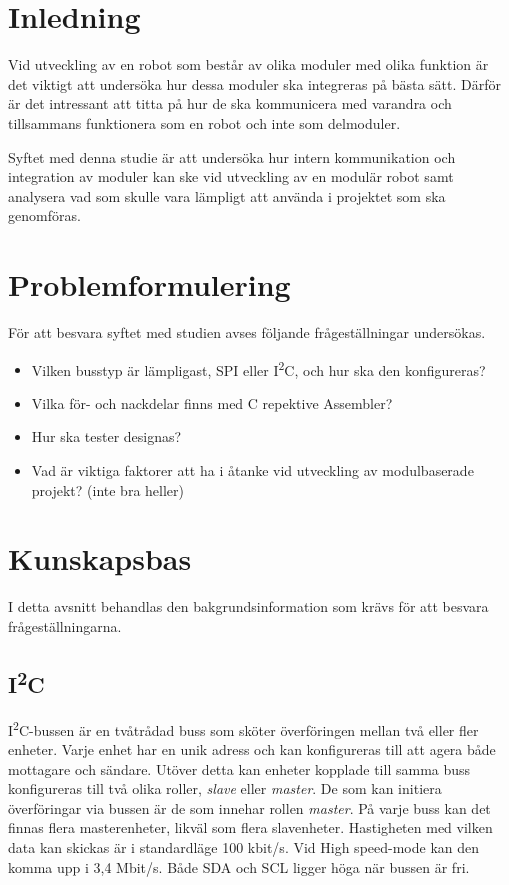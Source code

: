 \documentclass[11pt]{article}
\begin{document}
\begin{flushleft}

\section{Inledning}
Vid utveckling av en robot som består av olika moduler med olika funktion är det viktigt att undersöka hur dessa moduler ska integreras på bästa sätt. Därför är det intressant att titta på hur de ska kommunicera med varandra och tillsammans funktionera som en robot och inte som delmoduler. 

Syftet med denna studie är att undersöka hur intern kommunikation och integration av moduler kan ske vid utveckling av en modulär robot samt analysera vad som skulle vara lämpligt att använda i projektet som ska genomföras.

\section{Problemformulering}
För att besvara syftet med studien avses följande frågeställningar undersökas.

\begin{itemize}
	\item Vilken busstyp är lämpligast, SPI eller I\textsuperscript{2}C, och hur ska den konfigureras?
	\item Vilka för- och nackdelar finns med C repektive Assembler? 
	\item Hur ska tester designas?
	\item Vad är viktiga faktorer att ha i åtanke vid utveckling av modulbaserade projekt? (inte bra heller)
\end{itemize}

\pagebreak

\section{Kunskapsbas}
I detta avsnitt behandlas den bakgrundsinformation som krävs för att besvara frågeställningarna.

\subsection{I\textsuperscript{2}C}

I\textsuperscript{2}C-bussen är en tvåtrådad buss som sköter överföringen mellan två eller fler enheter. Varje enhet har en unik adress och kan konfigureras till att agera både mottagare och sändare. Utöver detta kan enheter kopplade till samma buss konfigureras till två olika roller, \textit{slave} eller \textit{master}. De som kan initiera överföringar via bussen är de som innehar rollen \textit{master}. På varje buss kan det finnas flera masterenheter, likväl som flera slavenheter. Hastigheten med vilken data kan skickas är i standardläge 100 kbit/s. Vid High speed-mode kan den komma upp i 3,4 Mbit/s. Både SDA och SCL ligger höga när bussen är fri.


\end{flushleft}
\end{document}
